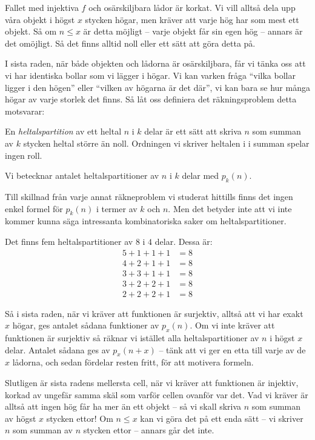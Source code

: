 \documentclass[nobib]{tufte-handout}
\begin{document}
Fallet med injektiva $f$ och osärskiljbara lådor är korkat. Vi vill alltså dela upp våra objekt i högst $x$ stycken högar, men kräver att varje hög har som mest ett objekt. Så om $n \leq x$ är detta möjligt -- varje objekt får sin egen hög -- annars är det omöjligt. Så det finns alltid noll eller ett sätt att göra detta på.

I sista raden, när både objekten och lådorna är osärskiljbara, får vi tänka oss att vi har identiska bollar som vi lägger i högar. Vi kan varken fråga ``vilka bollar ligger i den högen'' eller ``vilken av högarna är det där'', vi kan bara se hur många högar av varje storlek det finns. Så låt oss definiera det räkningsproblem detta motsvarar:

\begin{definition}
  En \emph{heltalspartition} av ett heltal $n$ i $k$ delar är ett sätt att skriva $n$ som summan av $k$ stycken heltal större än noll. Ordningen vi skriver heltalen i i summan spelar ingen roll. 
  
  Vi betecknar antalet heltalspartitioner av $n$ i $k$ delar med $p_k(n)$.
\end{definition}

Till skillnad från varje annat räkneproblem vi studerat hittills finns det ingen enkel formel för $p_k(n)$ i termer av $k$ och $n$. Men det betyder inte att vi inte kommer kunna säga intressanta kombinatoriska saker om heltalspartitioner.

\begin{example}
  Det finns fem heltalspartitioner av $8$ i $4$ delar. Dessa är:
  \begin{align*}
    5 + 1 + 1 + 1 &= 8\\
    4 + 2 + 1 + 1 &= 8\\
    3 + 3 + 1 + 1 &= 8\\
    3 + 2 + 2 + 1 &= 8\\
    2 + 2 + 2 + 1 &= 8
  \end{align*}
\end{example}

Så i sista raden, när vi kräver att funktionen är surjektiv, alltså att vi har exakt $x$ högar, ges antalet sådana funktioner av $p_x(n)$. Om vi inte kräver att funktionen är surjektiv så räknar vi istället alla heltalspartitioner av $n$ i högst $x$ delar. Antalet sådana ges av $p_x(n+x)$ -- tänk att vi ger en etta till varje av de $x$ lådorna, och sedan fördelar resten fritt, för att motivera formeln.

Slutligen är sista radens mellersta cell, när vi kräver att funktionen är injektiv, korkad av ungefär samma skäl som varför cellen ovanför var det. Vad vi kräver är alltså att ingen hög får ha mer än ett objekt -- så vi skall skriva $n$ som summan av högst $x$ stycken ettor! Om $n \leq x$ kan vi göra det på ett enda sätt -- vi skriver $n$ som summan av $n$ stycken ettor -- annars går det inte.
\end{document}
